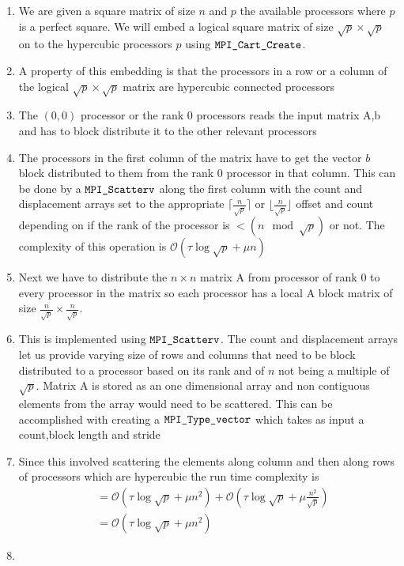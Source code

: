 \documentclass[twoside,11pt]{article}\usepackage{amsmath,amsfonts,amsthm,fullpage}
\begin{document}
\begin{enumerate}
\item
We are given a square matrix of size $n$ and $p$ the available processors where $p$ is a perfect square. We will embed a logical square matrix of size  $\sqrt{p}\times\sqrt{p}$ on to the hypercubic processors $p$ using $\verb|MPI_Cart_Create|$. 
\item
A property of this embedding is that the processors in a row or a column of the logical $\sqrt{p}\times\sqrt{p}$ matrix are hypercubic connected processors
\item
The $(0,0)$ processor or the rank $0$ processors reads the input matrix A,b and has to block distribute it to the other relevant processors
\item
The processors in the first column of the matrix have to get the vector $b$ block distributed to them from the rank $0$ processor in that column. This can be done by a $\verb|MPI_Scatterv|$ along the first column with the count and displacement arrays set to the appropriate $\lceil \frac{n}{\sqrt{p}} \rceil$ or $\lfloor \frac{n}{\sqrt{p}} \rfloor$ offset and count depending on if the rank of the processor is $< (n \mod \sqrt{p})$  or not. The complexity of this operation is $ \mathcal{O}(\tau \log \sqrt{p} + \mu n)$
\item
Next we have to distribute the $n\times n$ matrix A from processor of rank $0$ to every processor in the matrix so each processor has a local A block matrix of size $\frac{n}{\sqrt{p}} \times \frac{n}{\sqrt{p}}$. 
\item
This is implemented using $\verb|MPI_Scatterv|$. The count and displacement arrays let us provide varying size of rows and columns that need to be block distributed to a processor based on its rank and of $n$ not being a multiple of $\sqrt{p}$. Matrix A is stored as an one dimensional array and non contiguous elements from the array would need to be scattered. This can be accomplished with creating a $\verb|MPI_Type_vector|$ which takes as input a count,block length and stride
\item
Since this involved scattering the elements along column and then along rows of processors which are hypercubic the run time complexity is
\begin{align}
&= \mathcal{O}(\tau \log \sqrt{p} + \mu n^2) + \mathcal{O}(\tau \log \sqrt{p} + \mu \frac{n^2}{\sqrt{p}})\nonumber\\
&= \mathcal{O}(\tau \log \sqrt{p} + \mu n^2) \label{l_1}
\end{align}
\item

\end{enumerate}
\end{document}
